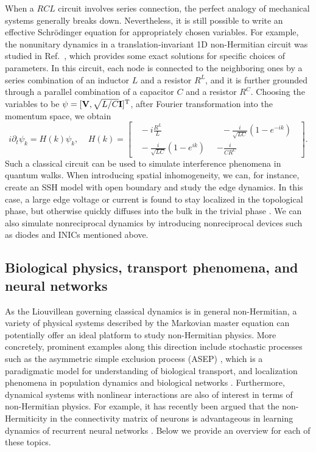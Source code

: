 \documentclass{tADP2e}
\theoremstyle{plain}
\theoremstyle{plain}
\theoremstyle{definition}
\begin{document}
When a $RCL$ circuit involves series connection, the perfect analogy of mechanical systems generally breaks down. Nevertheless, it is still possible to write an effective Schr\"odinger equation for appropriately chosen variables. For example, the nonunitary dynamics in a translation-invariant 1D non-Hermitian circuit  was studied in Ref.~\cite{EM19c}, which provides some exact solutions for specific choices of parameters. In this circuit, each node is connected to the neighboring ones by a series combination of an inductor $L$ and a resistor $R^L$, and it is further grounded through a parallel combination of a capacitor $C$ and a resistor $R^C$. Choosing the variables to be $\psi=[\bold{V},\sqrt{L/C}\bold{I}]^{\rm T}$, after Fourier transformation into the momentum space, we obtain 
\begin{equation}
i\partial_t\psi_k=H(k)\psi_k,\;\;\;\;
H(k)=\begin{bmatrix}
\;\;-i\frac{R^L}{L}\;\; & \;\;-\frac{i}{\sqrt{LC}}(1-e^{-ik})\;\; \\
\;\;-\frac{i}{\sqrt{LC}}(1-e^{ik})\;\; & -\frac{i}{CR^C}
\end{bmatrix}.
\end{equation}
Such a classical circuit can be used to simulate interference phenomena in quantum walks. When introducing spatial inhomogeneity, we can, for instance, create an SSH model with open boundary and study the edge dynamics. In this case, a large edge voltage or current is found to stay localized in the topological phase, but otherwise quickly diffuses into the bulk in the trivial phase \cite{EM19c}. We can also simulate nonreciprocal dynamics by introducing nonreciprocal devices such as diodes and INICs mentioned above.


\subsection{Biological physics, transport phenomena, and neural networks\label{secbio}}
As the Liouvillean governing classical dynamics is in general non-Hermitian, a variety of physical systems described by the Markovian master equation  can potentially offer an ideal platform to study non-Hermitian physics. More concretely, prominent examples along this direction include stochastic processes such as the asymmetric simple exclusion process (ASEP) \cite{MCT68,MCT69}, which is a paradigmatic model for understanding of biological transport, and localization phenomena in population dynamics and biological networks \cite{MRM72,NDR98}.
Furthermore, dynamical systems with nonlinear interactions are also of interest in terms of non-Hermitian physics. For example, it has recently been argued that the non-Hermiticity in the connectivity matrix of neurons is advantageous in learning dynamics of recurrent neural networks \cite{GS08,KG19}. Below we provide an overview for each of these  topics.    
\end{document}
